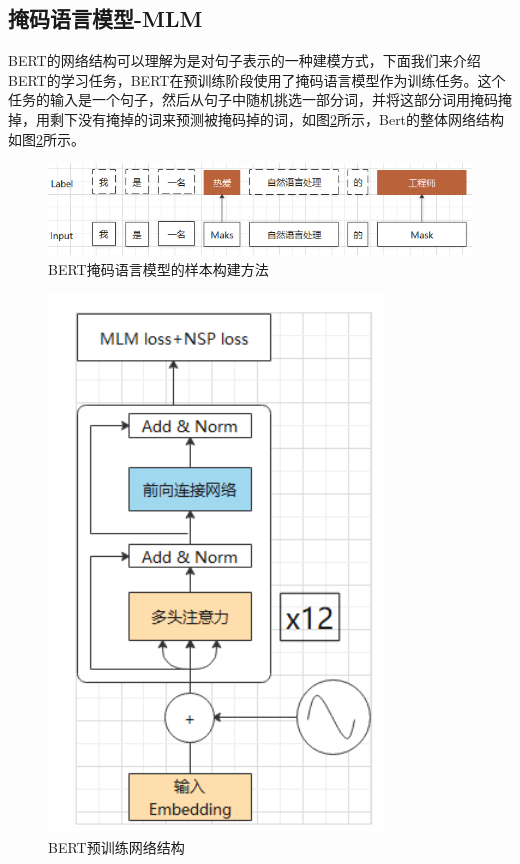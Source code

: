\documentclass[twoside,a4paper,12pt]{book}%
\begin{document}
\subsection{掩码语言模型-MLM}
\gls{BERT}的网络结构可以理解为是对句子表示的一种建模方式，下面我们来介绍\gls{BERT}的学习任务，\gls{BERT}在预训练阶段使用了掩码语言模型作为训练任务。这个任务的输入是一个句子，然后从句子中随机挑选一部分词，并将这部分词用掩码掩掉，用剩下没有掩掉的词来预测被掩码掉的词，如图\ref{fig:bert2}所示，Bert的整体网络结构如图\ref{fig:bert2}所示。
\begin{figure}[!h]
\begin{center}
\includegraphics[width=5.6in]{figures/bert2.png}
\caption{BERT掩码语言模型的样本构建方法}
\label{fig:bert2}
\end{center}
\end{figure}
\begin{figure}[h]
	\begin{center}
		\includegraphics[width=3.5in]{figures/bert3.png}
		\caption{\gls{BERT}预训练网络结构}
		\label{fig:bert2}
	\end{center}
\end{figure}
\end{document}
